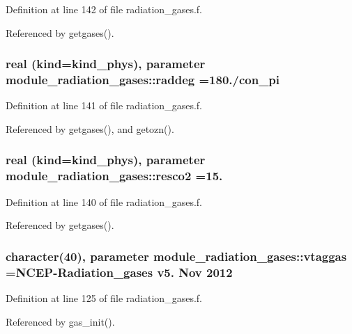 Definition at line 142 of file radiation\+\_\+gases.\+f.



Referenced by getgases().

\subsubsection[{\texorpdfstring{raddeg}{raddeg}}]{\setlength{\rightskip}{0pt plus 5cm}real (kind=kind\+\_\+phys), parameter module\+\_\+radiation\+\_\+gases\+::raddeg =180./con\+\_\+pi\hspace{0.3cm}{\ttfamily [private]}}\hypertarget{namespacemodule__radiation__gases_aa5873ae54e950001ff873771378e7a1e}{}\label{namespacemodule__radiation__gases_aa5873ae54e950001ff873771378e7a1e}


Definition at line 141 of file radiation\+\_\+gases.\+f.



Referenced by getgases(), and getozn().

\subsubsection[{\texorpdfstring{resco2}{resco2}}]{\setlength{\rightskip}{0pt plus 5cm}real (kind=kind\+\_\+phys), parameter module\+\_\+radiation\+\_\+gases\+::resco2 =15.\hspace{0.3cm}{\ttfamily [private]}}\hypertarget{namespacemodule__radiation__gases_afda5c1d1129d865b9772e0f58dea7598}{}\label{namespacemodule__radiation__gases_afda5c1d1129d865b9772e0f58dea7598}


Definition at line 140 of file radiation\+\_\+gases.\+f.



Referenced by getgases().

\subsubsection[{\texorpdfstring{vtaggas}{vtaggas}}]{\setlength{\rightskip}{0pt plus 5cm}character(40), parameter module\+\_\+radiation\+\_\+gases\+::vtaggas =\textquotesingle{}N\+C\+EP-\/Radiation\+\_\+gases v5. Nov 2012 \textquotesingle{}\hspace{0.3cm}{\ttfamily [private]}}\hypertarget{namespacemodule__radiation__gases_a8a79a6d3d931da021cd19290c58bdfaa}{}\label{namespacemodule__radiation__gases_a8a79a6d3d931da021cd19290c58bdfaa}


Definition at line 125 of file radiation\+\_\+gases.\+f.



Referenced by gas\+\_\+init().

